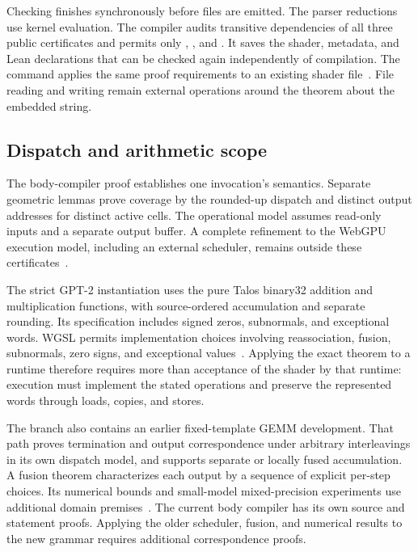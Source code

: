 Checking finishes synchronously before files are emitted.  The parser reductions use kernel evaluation.  The compiler audits transitive dependencies of all three public certificates and permits only , , and .  It saves the shader, metadata, and Lean declarations that can be checked again independently of compilation.  The command  applies the same proof requirements to an existing shader file~\cite{wg-compiler}.  File reading and writing remain external operations around the theorem about the embedded string.

\subsection{Dispatch and arithmetic scope}

The body-compiler proof establishes one invocation's semantics.  Separate geometric lemmas prove coverage by the rounded-up dispatch and distinct output addresses for distinct active cells.  The operational model assumes read-only inputs and a separate output buffer.  A complete refinement to the WebGPU execution model, including an external scheduler, remains outside these certificates~\cite{wg-execution}.

The strict GPT-2 instantiation uses the pure Talos binary32 addition and multiplication functions, with source-ordered accumulation and separate rounding.  Its specification includes signed zeros, subnormals, and exceptional words.  WGSL permits implementation choices involving reassociation, fusion, subnormals, zero signs, and exceptional values~\cite{wg-wgsl}.  Applying the exact theorem to a runtime therefore requires more than acceptance of the shader by that runtime: execution must implement the stated operations and preserve the represented words through loads, copies, and stores.

The branch also contains an earlier fixed-template GEMM development.  That path proves termination and output correspondence under arbitrary interleavings in its own dispatch model, and supports separate or locally fused accumulation.  A fusion theorem characterizes each output by a sequence of explicit per-step choices.  Its numerical bounds and small-model mixed-precision experiments use additional domain premises~\cite{wg-legacy}.  The current body compiler has its own source and statement proofs.  Applying the older scheduler, fusion, and numerical results to the new grammar requires additional correspondence proofs.

